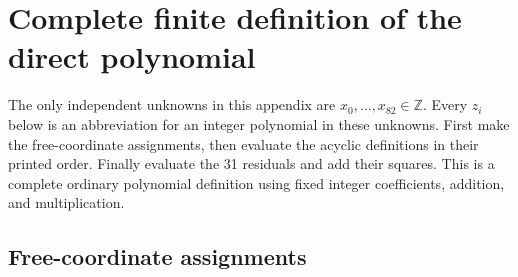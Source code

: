 \section{Complete finite definition of the direct polynomial}\label{app:direct83-definition}
The only independent unknowns in this appendix are $x_0,\ldots,x_{82}\in\mathbb Z$. Every $z_i$ below is an abbreviation for an integer polynomial in these unknowns. First make the free-coordinate assignments, then evaluate the acyclic definitions in their printed order. Finally evaluate the 31 residuals and add their squares. This is a complete ordinary polynomial definition using fixed integer coefficients, addition, and multiplication.
\begingroup\small\allowdisplaybreaks
\subsection*{Free-coordinate assignments}
